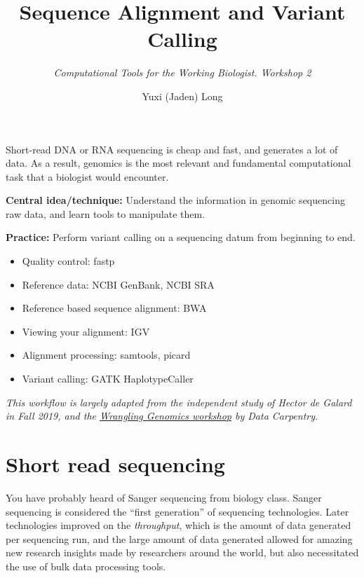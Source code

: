 \documentclass[12pt,letterpaper]{article}
\title{\textbf{Sequence Alignment and Variant Calling}}
\author{\textit{Computational Tools for the Working Biologist. Workshop 2}}
\date{Yuxi (Jaden) Long}
\begin{document}
\maketitle
\thispagestyle{empty}

\vspace{1em}

\noindent
Short-read DNA or RNA sequencing is cheap and fast, and generates a lot of data. As a result, genomics is the most relevant and fundamental computational task that a biologist would encounter.

\noindent
\textbf{Central idea/technique:} Understand the information in genomic sequencing raw data, and learn tools to manipulate them.

\textbf{Practice:} Perform variant calling on a sequencing datum from beginning to end.

\begin{itemize}
   \item Quality control: fastp
   \item Reference data: NCBI GenBank, NCBI SRA
   \item Reference based sequence alignment: BWA
   \item Viewing your alignment: IGV
   \item Alignment processing: samtools, picard
   \item Variant calling: GATK HaplotypeCaller
\end{itemize}

\textit{This workflow is largely adapted from the independent study of Hector de Galard in Fall 2019, and the \href{https://www.hadriengourle.com/wrangling-genomics/01-variant_calling_workflow/}{Wrangling Genomics workshop} by Data Carpentry.}

\section{Short read sequencing}

You have probably heard of Sanger sequencing from biology class. Sanger sequencing is considered the ``first generation'' of sequencing technologies. Later technologies improved on the \textit{throughput}, which is the amount of data generated per sequencing run, and the large amount of data generated allowed for amazing new research insights made by researchers around the world, but also necessitated the use of bulk data processing tools.
\end{document}
